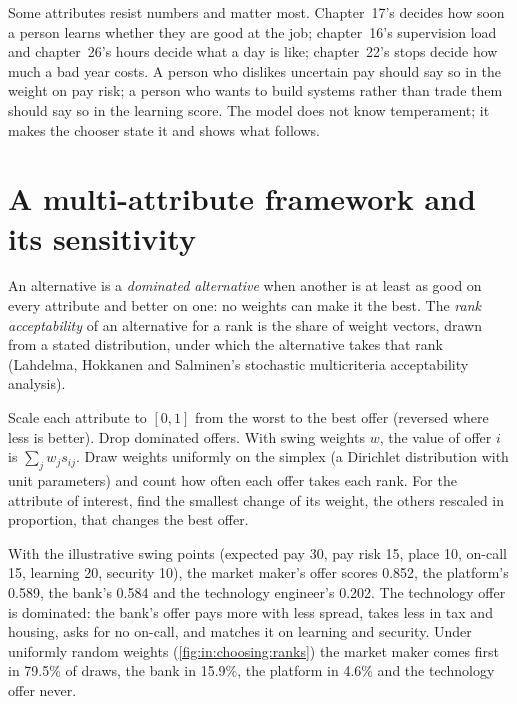Some attributes resist numbers and matter most. Chapter~17's  decides how soon a person learns whether
they are good at the job; chapter~16's supervision load and chapter~26's hours decide what a day is like; chapter~22's
stops decide how much a bad year costs. A person who dislikes uncertain pay should say so in the weight on pay risk; a
person who wants to build systems rather than trade them should say so in the learning score. The model does not know
temperament; it makes the chooser state it and shows what follows.

\section{A multi-attribute framework and its sensitivity}

\begin{definition}\label{def:in:choosing:smaa}
An alternative is a \emph{dominated alternative} when another is at least as good on every
attribute and better on one: no weights can make it the best. The \emph{rank acceptability}
of an alternative for a rank is the share of weight vectors, drawn from a stated distribution, under which the
alternative takes that rank (Lahdelma, Hokkanen and Salminen's stochastic multicriteria acceptability analysis).
\end{definition}

\begin{method}\label{met:in:choosing:method}
Scale each attribute to $[0,1]$ from the worst to the best offer (reversed where less is better). Drop dominated offers.
With swing weights $w$, the value of offer $i$ is $\sum_j w_j s_{ij}$. Draw weights uniformly on the simplex (a
Dirichlet distribution with unit parameters) and count how often each offer takes each rank. For the attribute of
interest, find the smallest change of its weight, the others rescaled in proportion, that changes the best offer.
\end{method}

With the illustrative swing points (expected pay 30, pay risk 15, place 10, on-call 15, learning 20, security 10), the
market maker's offer scores 0.852, the platform's 0.589, the bank's 0.584 and the technology engineer's 0.202. The
technology offer is dominated: the bank's offer pays more with less spread, takes less in tax and housing, asks for no
on-call, and matches it on learning and security. Under uniformly random weights (\cref{fig:in:choosing:ranks}) the
market maker comes first in 79.5\% of draws, the bank in 15.9\%, the platform in 4.6\% and the technology offer never.

